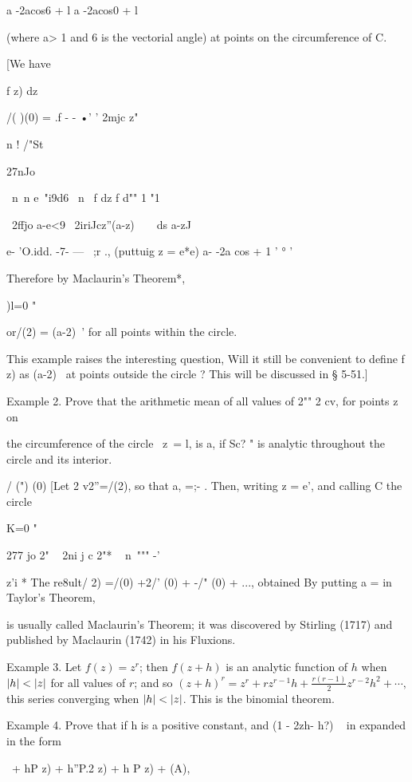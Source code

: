 {{a -2acos6 + l a -2acos0 + l

(where a> 1 and 6 is the vectorial angle) at points on the
circumference of C.

[We have

f z) dz

/( )(0) = .f - - •' ' 2mjc z"

n ! /"St

27nJo

\ n\ n e~"i9d6 \ n \ f dz f d"" 1 "1

~2ffjo a-e<9 ~2iriJcz''(a-z)~~\ \ ds a-zJ

e- 'O.idd. -7- — ~;r ., (puttuig z = e*e) a- -2a cos + 1 ' ° '

Therefore by Maclaurin's Theorem*,

)l=0 "

or/(2) = (a-2)~' for all points within the circle.

This example raises the interesting question, Will it still be
convenient to define f z) as (a-2)~ at points outside the circle ?
This will be discussed in § 5-51.]

Example 2. Prove that the arithmetic mean of all values of 2"" 2 cv,
for points z on

the circumference of the circle \ z\ = l, is a, if Sc? " is analytic
throughout the circle and its interior.

/ (") (0) [Let 2 v2''=/(2), so that a, =;- . Then, writing z = e',
and calling C the circle

K=0 "

277 jo 2" ~ 2ni j c 2"* ~ n\ """ -'

z'i * The re8ult/ 2) =/(0) +2/' (0) + -/" (0) + ..., obtained By
putting a = in Taylor's Theorem,

is usually called Maclaurin's Theorem; it was discovered by Stirling
(1717) and published by Maclaurin (1742) in his Fluxions.

%
%

Example 3. Let $f(z) = z^{r}$; then $f(z+h)$ is an analytic function
of $h$ when $\left| h \right| < \left| z \right|$ for all values of $r$; and so
$(z + h)^{r} = z^{r} + rz^{r-1} h + \frac{ r (r-1) }{2} z^{r-2} h^{2}
+ \cdots, $ this series converging when $\left| h \right| < \left| z \right|$.
This is the binomial theorem.

Example 4. Prove that if h is a positive constant, and (1 - 2zh- h?) ~
in expanded in the form

\ + hP z) + h''P.2 z) + h P z) + (A),

}}
